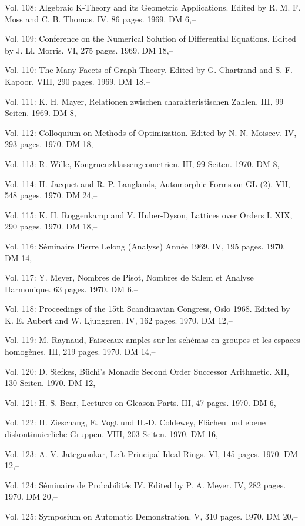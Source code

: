 Vol. 108: Algebraic K-Theory and its Geometric Applications. Edited by R. M. F. Moss and C. B. Thomas. IV, 86 pages. 1969. DM 6,--

Vol. 109: Conference on the Numerical Solution of Differential Equations. Edited by J. Ll. Morris. VI, 275 pages. 1969. DM 18,--

Vol. 110: The Many Facets of Graph Theory. Edited by G. Chartrand and S. F. Kapoor. VIII, 290 pages. 1969. DM 18,--

Vol. 111: K. H. Mayer, Relationen zwischen charakteristischen Zahlen. III, 99 Seiten. 1969. DM 8,--

Vol. 112: Colloquium on Methods of Optimization. Edited by N. N. Moiseev. IV, 293 pages. 1970. DM 18,--

Vol. 113: R. Wille, Kongruenzklassengeometrien. III, 99 Seiten. 1970. DM 8,--

Vol. 114: H. Jacquet and R. P. Langlands, Automorphic Forms on GL (2). VII, 548 pages. 1970. DM 24,--

Vol. 115: K. H. Roggenkamp and V. Huber-Dyson, Lattices over Orders I. XIX, 290 pages. 1970. DM 18,--

Vol. 116: Séminaire Pierre Lelong (Analyse) Année 1969. IV, 195 pages. 1970. DM 14,--

Vol. 117: Y. Meyer, Nombres de Pisot, Nombres de Salem et Analyse Harmonique. 63 pages. 1970. DM 6.--

Vol. 118: Proceedings of the 15th Scandinavian Congress, Oslo 1968. Edited by K. E. Aubert and W. Ljunggren. IV, 162 pages. 1970. DM 12,--

Vol. 119: M. Raynaud, Faisceaux amples sur les schémas en groupes et les espaces homogènes. III, 219 pages. 1970. DM 14,--

Vol. 120: D. Siefkes, Büchi's Monadic Second Order Successor Arithmetic. XII, 130 Seiten. 1970. DM 12,--

Vol. 121: H. S. Bear, Lectures on Gleason Parts. III, 47 pages. 1970. DM 6,--

Vol. 122: H. Zieschang, E. Vogt und H.-D. Coldewey, Flächen und ebene diskontinuierliche Gruppen. VIII, 203 Seiten. 1970. DM 16,--

Vol. 123: A. V. Jategaonkar, Left Principal Ideal Rings. VI, 145 pages. 1970. DM 12,--

Vol. 124: Séminaire de Probabilités IV. Edited by P. A. Meyer. IV, 282 pages. 1970. DM 20,--

Vol. 125: Symposium on Automatic Demonstration. V, 310 pages. 1970. DM 20,--

